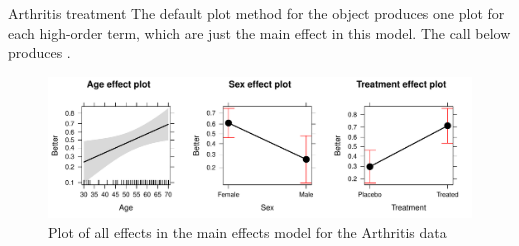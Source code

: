 \documentclass[11pt]{book}
\renewenvironment{knitrout}{\small\renewcommand{\baselinestretch}{.85}}{} %
\begin{document}
\begin{Example}{Arthritis treatment}
The default plot method for the  object produces one plot for each high-order
term, which are just the main effect in this model.  The call below produces
.
\begin{knitrout}
\color{fgcolor}\begin{kframe}
\begin{alltt}
 \hlstd{=}\hlstd{,} \hlstd{=}\hlstd{)}
\end{alltt}
\end{kframe}\begin{figure}[!htbp]


\centerline{\includegraphics[width=\textwidth]{ch07/fig/arth-effplot1} }

\caption[Plot of all effects in the main effects model for the Arthritis data]{Plot of all effects in the main effects model for the Arthritis data\label{fig:arth-effplot1}}
\end{figure}


\end{knitrout}


\end{Example}
\end{document}

